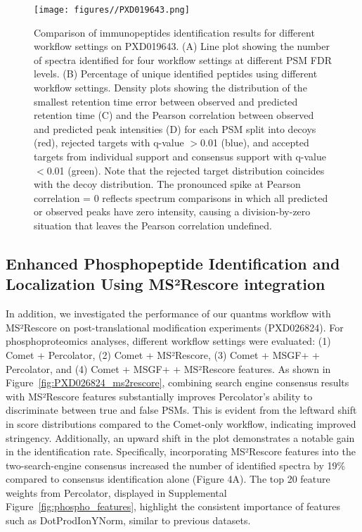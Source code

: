 \documentclass[12pt]{article}
\begin{document}

\begin{figure}[ht!]
	\centering
	\texttt{[image: figures//PXD019643.png]}
	\caption{Comparison of immunopeptides identification results for different workflow settings on PXD019643. (A) Line plot showing the number of spectra identified for four workflow settings at different PSM FDR levels. (B) Percentage of unique identified peptides using different workflow settings. Density plots showing the distribution of the smallest retention time error between observed and predicted retention time (C) and the Pearson correlation between observed and predicted peak intensities (D) for each PSM split into decoys (red), rejected targets with q-value $>$0.01 (blue), and accepted targets from individual support and consensus support with q-value $<$0.01 (green). Note that the rejected target distribution coincides with the decoy distribution. The pronounced spike at Pearson correlation = 0 reflects spectrum comparisons in which all predicted or observed peaks have zero intensity, causing a division-by-zero situation that leaves the Pearson correlation undefined.}
	\label{fig:PXD019643_immunopeptides}
\end{figure}

\subsection{Enhanced Phosphopeptide Identification and Localization Using MS²Rescore integration}
In addition, we investigated the performance of our quantms workflow with MS²Rescore on post-translational modification experiments (PXD026824). For phosphoproteomics analyses, different workflow settings were evaluated: (1) Comet + Percolator, (2) Comet + MS²Rescore, (3) Comet + MSGF+ + Percolator, and (4) Comet + MSGF+ + MS²Rescore features. As shown in Figure~\ref{fig:PXD026824_ms2rescore}, combining search engine consensus results with MS²Rescore features substantially improves Percolator's ability to discriminate between true and false PSMs. This is evident from the leftward shift in score distributions compared to the Comet-only workflow, indicating improved stringency. %
Additionally, an upward shift in the plot demonstrates a notable gain in the identification rate. %
Specifically, incorporating MS²Rescore features into the two-search-engine consensus increased the number of identified spectra by 19\% compared to consensus identification alone (Figure 4A). The top 20 feature weights from Percolator, displayed in Supplemental Figure~\ref{fig:phospho_features}, highlight the consistent importance of features such as DotProdIonYNorm, similar to previous datasets.
\end{document}
